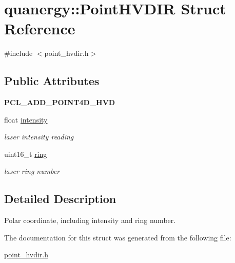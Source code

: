 \hypertarget{structquanergy_1_1PointHVDIR}{\section{quanergy\-:\-:Point\-H\-V\-D\-I\-R Struct Reference}
\label{structquanergy_1_1PointHVDIR}
}


{\ttfamily \#include $<$point\-\_\-hvdir.\-h$>$}

\subsection*{Public Attributes}
\begin{DoxyCompactItemize}
\item 
\hypertarget{structquanergy_1_1PointHVDIR_a9a31534d462255e0d11a8838c5ea89fa}{{\bfseries P\-C\-L\-\_\-\-A\-D\-D\-\_\-\-P\-O\-I\-N\-T4\-D\-\_\-\-H\-V\-D}}\label{structquanergy_1_1PointHVDIR_a9a31534d462255e0d11a8838c5ea89fa}

\item 
\hypertarget{structquanergy_1_1PointHVDIR_a0fed792362bcfdd4bf79e91b7ab872f2}{float \hyperlink{structquanergy_1_1PointHVDIR_a0fed792362bcfdd4bf79e91b7ab872f2}{intensity}}\label{structquanergy_1_1PointHVDIR_a0fed792362bcfdd4bf79e91b7ab872f2}

\begin{DoxyCompactList}\small\item\em laser intensity reading \end{DoxyCompactList}\item 
\hypertarget{structquanergy_1_1PointHVDIR_a67e32c361914ce014f6d1c081b1596a0}{uint16\-\_\-t \hyperlink{structquanergy_1_1PointHVDIR_a67e32c361914ce014f6d1c081b1596a0}{ring}}\label{structquanergy_1_1PointHVDIR_a67e32c361914ce014f6d1c081b1596a0}

\begin{DoxyCompactList}\small\item\em laser ring number \end{DoxyCompactList}\end{DoxyCompactItemize}


\subsection{Detailed Description}
Polar coordinate, including intensity and ring number. 

The documentation for this struct was generated from the following file\-:\begin{DoxyCompactItemize}
\item 
\hyperlink{point__hvdir_8h}{point\-\_\-hvdir.\-h}\end{DoxyCompactItemize}
